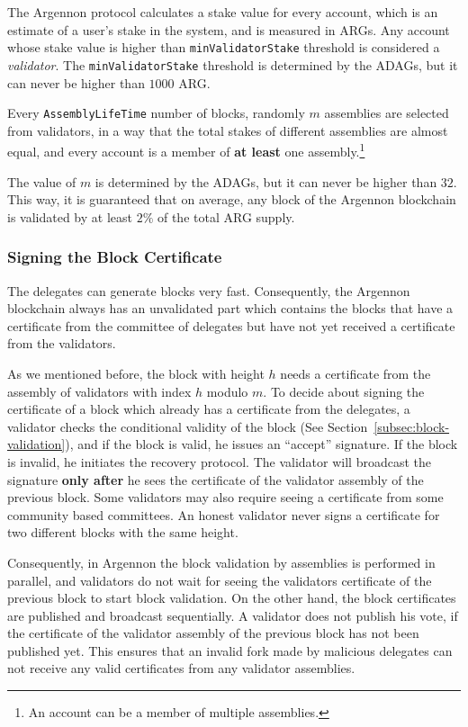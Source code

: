 The Argennon protocol calculates a stake value for every account, which is an estimate of a user's stake in the
system, and is measured in ARGs. Any account whose stake value is higher than
\texttt{minValidatorStake} threshold is considered a \emph{validator}.
The \texttt{minValidatorStake}
threshold is determined by the ADAGs, but it can never be higher than $1000$ ARG\@.

Every \texttt{AssemblyLifeTime} number of blocks, randomly $m$ assemblies are selected from
validators, in a way that the total stakes of different assemblies are almost equal, and every
account is a member of \textbf{at least} one assembly.\footnote{An account can be a member of multiple assemblies.}

The value of $m$ is determined by the ADAGs, but it can never be higher than $32$. This way, it is guaranteed
that on average, any block of the Argennon blockchain is validated by at least $2\%$ of the total ARG supply.

\subsubsection{Signing the Block Certificate}

The delegates can generate blocks very fast. Consequently, the Argennon blockchain always has an
unvalidated part which contains the blocks that have a certificate from the committee of delegates but have not
yet received a certificate from the validators.

As we mentioned before, the block with height $h$ needs a certificate from the assembly of
validators with index $h$ modulo $m$. To decide about signing the certificate of a block which already has
a certificate from the delegates, a validator checks the conditional
validity of the block (See Section~\ref{subsec:block-validation}), and if the block is valid, he issues
an ``accept'' signature. If the block is invalid, he initiates the recovery protocol. The validator will broadcast
the signature \textbf{only after} he sees the certificate of the validator assembly of the previous block.
Some validators may also require seeing a certificate from
some community based committees. An honest validator never signs a certificate for two different blocks with the
same height.

Consequently, in Argennon the block validation by assemblies is performed in parallel, and validators
do not wait for seeing the validators certificate of the previous block to start block validation. On the
other hand, the block certificates are published and broadcast sequentially. A validator does not publish his vote,
if the certificate of the validator assembly of the previous block has not been published yet. This ensures
that an invalid fork made by malicious delegates can not receive any valid certificates from any validator assemblies.

